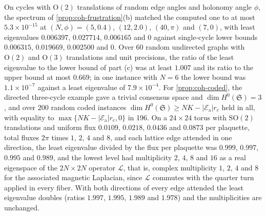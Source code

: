 \begin{numcheck}[Frustration]\label{chk:coh-frustration}
On cycles with $\mathrm O(2)$ translations of random edge angles and holonomy angle $\phi$, the spectrum of \cref{prop:coh-frustration}(b) matched the computed one to at most $5.3\times10^{-15}$ at $(N,\phi)=(5,0.4)$, $(12,2.0)$, $(40,\pi)$ and $(7,0)$, with least eigenvalues $0.006397$, $0.027714$, $0.006165$ and $0$ against single-cycle lower bounds $0.006315$, $0.019669$, $0.002500$ and $0$. Over 60 random undirected graphs with $\mathrm O(2)$ and $\mathrm O(3)$ translations and unit precisions, the ratio of the least eigenvalue to the lower bound of part (c) was at least $1.007$ and its ratio to the upper bound at most $0.669$; in one instance with $N=6$ the lower bound was $1.1\times10^{-7}$ against a least eigenvalue of $7.9\times10^{-4}$. For \cref{prop:coh-coded}, the directed three-cycle example gave a trivial consensus space and $\dim H^0(\mathfrak S)=3$, and over 200 random coded instances $\dim H^0(\mathfrak S)\ge NK-|\mathcal E_{\mathrm a}|r_c$ held in all, with equality to $\max\{NK-|\mathcal E_{\mathrm a}|r_c,0\}$ in 196. On a $24\times24$ torus with $\mathrm{SO}(2)$ translations and uniform flux $0.0109$, $0.0218$, $0.0436$ and $0.0873$ per plaquette, total fluxes $2\pi$ times $1$, $2$, $4$ and $8$, and each lattice edge attended in one direction, the least eigenvalue divided by the flux per plaquette was $0.999$, $0.997$, $0.995$ and $0.989$, and the lowest level had multiplicity $2$, $4$, $8$ and $16$ as a real eigenspace of the $2N\times2N$ operator $\mathcal L$, that is, complex multiplicity $1$, $2$, $4$ and $8$ for the associated magnetic Laplacian, since $\mathcal L$ commutes with the quarter turn applied in every fiber. With both directions of every edge attended the least eigenvalue doubles (ratios $1.997$, $1.995$, $1.989$ and $1.978$) and the multiplicities are unchanged.
\end{numcheck}

